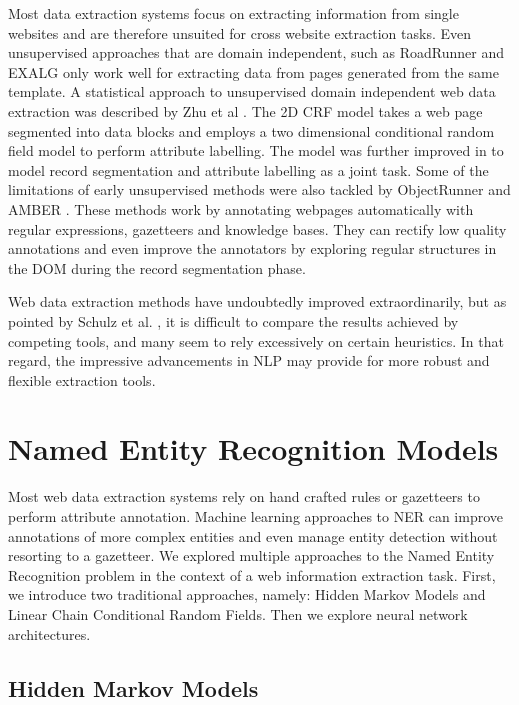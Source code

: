 \documentclass[sigconf]{acmart}
\begin{document}
Most data extraction systems focus on extracting information from single websites
and are therefore unsuited for cross website extraction tasks. Even unsupervised
approaches that are domain independent, such as RoadRunner \cite{Crescenzi2001} 
and EXALG \cite{Arasu2003} only work well for extracting data from pages generated 
from the same template. A statistical approach to unsupervised domain 
independent web data extraction was described by Zhu et al \cite{Zhu2005}. The 2D CRF 
model takes a web page segmented into data blocks and employs a two dimensional conditional 
random field model to perform attribute labelling. The model was further improved in 
\cite{Zhu2006} to model record segmentation and attribute labelling as a joint task.
Some of the limitations of early unsupervised methods 
were also tackled by ObjectRunner \cite{Abdessalem2010} and AMBER \cite{Furche2012}. 
These methods work by annotating webpages automatically with regular expressions, gazetteers and 
knowledge bases. They can rectify low quality annotations and even improve the annotators
by exploring regular structures in the DOM during the record segmentation phase.

Web data extraction methods have undoubtedly improved extraordinarily, but
as pointed by Schulz et al. \cite{Schulz2016}, it is difficult to compare the results 
achieved by competing tools, and many seem to rely excessively on certain heuristics.
In that regard, the impressive advancements in NLP may provide for more robust and
flexible extraction tools.

\section{Named Entity Recognition Models}

Most web data extraction systems rely on hand crafted rules or gazetteers to perform
attribute annotation. Machine learning approaches to NER can improve annotations of 
more complex entities and even manage entity detection without resorting to a gazetteer.
We explored multiple approaches to the Named Entity Recognition problem in the context 
of a web information extraction task. First, we introduce two traditional approaches, 
namely: Hidden Markov Models and Linear Chain Conditional Random Fields. Then
we explore neural network architectures.

\subsection{Hidden Markov Models}
\end{document}
